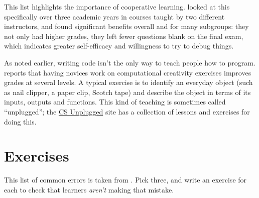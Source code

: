 This list highlights the importance of cooperative learning.
\cite{Beck2013} looked at this specifically over three academic years
in courses taught by two different instructors, and found significant
benefits overall and for many subgroups: they not only had higher
grades, they left fewer questions blank on the final exam, which
indicates greater self-efficacy and willingness to try to debug
things.

As noted earlier, writing code isn't the only way to teach people how
to program.  \cite{Shel2017} reports that having novices work on
computational creativity exercises improves grades at several levels.
A typical exercise is to identify an everyday object (such as nail
clipper, a paper clip, Scotch tape) and describe the object in terms
of its inputs, outputs and functions.  This kind of teaching is
sometimes called ``unplugged''; the
\href{https://csunplugged.org/en/}{CS Unplugged} site has a collection
of lessons and exercises for doing this.

\section{Exercises}\label{s:pck-exercises}


This list of common errors is taken from \cite{Sirk2012}.  Pick three,
and write an exercise for each to check that learners \emph{aren't}
making that mistake.

